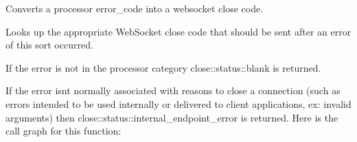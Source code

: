 Converts a processor error\+\_\+code into a websocket close code. 

Looks up the appropriate Web\+Socket close code that should be sent after an error of this sort occurred.

If the error is not in the processor category close\+::status\+::blank is returned.

If the error isn\textquotesingle{}t normally associated with reasons to close a connection (such as errors intended to be used internally or delivered to client applications, ex\+: invalid arguments) then close\+::status\+::internal\+\_\+endpoint\+\_\+error is returned. Here is the call graph for this function\+:
